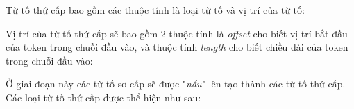 Từ tố thứ cấp bao gồm các thuộc tính là loại từ tố và vị trí của từ tố:

Vị trí của từ tố thứ cấp sẽ bao gồm 2 thuộc tính là \textit{offset} cho biết vị trí bắt đầu của token trong chuỗi đầu vào, và thuộc tính \textit{length} cho biết chiều dài của token trong chuỗi đầu vào:

Ở giai đoạn này các từ tố sơ cấp sẽ được "\textit{nấu}" lên tạo thành các từ tố thứ cấp. Các loại từ tố thứ cấp được thể hiện như sau:






